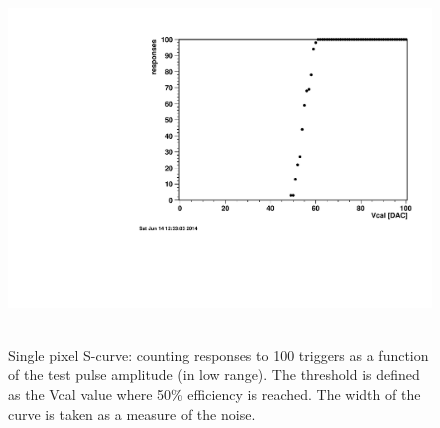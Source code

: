 \documentclass[english]{article}
\begin{document}
%
\begin{figure}
\hfill{}\includegraphics[scale=0.5]{c405-S-curve}\hfill{}~\protect\caption{Single pixel S-curve: counting responses to 100 triggers as a function
of the test pulse amplitude (in low range). The threshold is defined
as the Vcal value where 50\% efficiency is reached. The width of the
curve is taken as a measure of the noise.}
%
\end{figure}
\end{document}
